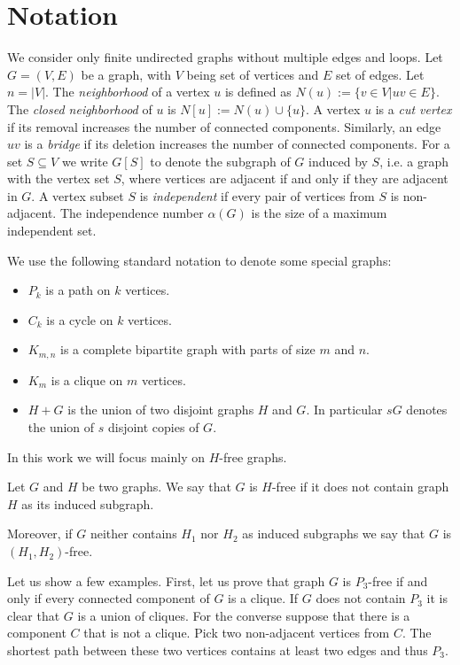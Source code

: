 \section{Notation}
We consider only finite undirected graphs without multiple edges and loops.
Let \(G=(V,E)\) be a graph, with \(V\) being set of vertices and \(E\) set of edges.
Let \(n = |V|\). 
The \emph{neighborhood} of a vertex \(u\) is defined as \(N(u) := \{v \in V | uv \in E\}\).
The \emph{closed neighborhood} of \(u\) is \(N[u]:=N(u) \cup \{u\}\). 
A vertex \(u\) is a \emph{cut vertex} if its removal increases the number of connected components.
Similarly, an edge \(uv\) is a \emph{bridge} if its deletion increases the number of connected components.
For a set \(S \subseteq V\) we write \(G[S]\) to denote the subgraph of \(G\) induced by \(S\), i.e. a graph with the vertex set \(S\), 
where vertices are adjacent if and only if they are adjacent in \(G\).
A vertex subset \(S\) is \emph{independent} if every pair of vertices from \(S\) is non-adjacent.
The independence number \(\alpha(G)\) is the size of a maximum independent set.

We use the following standard notation to denote some special graphs:
\begin{itemize}
	\item \(P_k\) is a path on \(k\) vertices.
	\item \(C_k\) is a cycle on \(k\) vertices.
	\item \(K_{m,n}\) is a complete bipartite graph with parts of size \(m\) and \(n\).
	\item \(K_m\) is a clique on \(m\) vertices.
	\item \(H + G\) is the union of two disjoint graphs \(H\) and \(G\). In particular \(sG\) denotes
		the union of \(s\) disjoint copies of \(G\).
\end{itemize}
In this work we will focus mainly on \(H\)-free graphs.
\begin{defn}\label{def1}
	Let \(G\) and \(H\) be two graphs. We say that \(G\) is \(H\)-free if it does not contain graph \(H\) as its induced subgraph.
\end{defn}
Moreover, if \(G\) neither contains \(H_1\) nor \(H_2\) as induced subgraphs we say that \(G\) is \((H_1, H_2)\)-free.

Let us show a few examples.
First, let us prove that graph \(G\) is \(P_3\)-free if and only if every connected component of \(G\) is a clique.
If \(G\) does not contain \(P_3\) it is clear that \(G\) is a union of cliques.
For the converse suppose that there is a component \(C\) that is not a clique. Pick two non-adjacent vertices from \(C\).
The shortest path between these two vertices contains at least two edges and thus \(P_3\).

